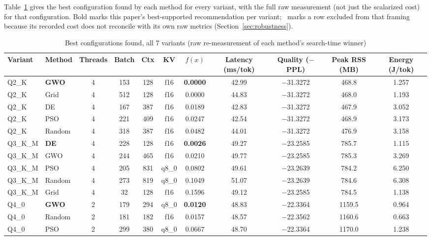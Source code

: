 \documentclass[journal]{IEEEtran}
\begin{document}
Table~\ref{tab:best-configs-all} gives the best configuration found by each method for every variant, with the full raw measurement (not just the scalarized cost) for that configuration. Bold marks this paper's best-supported recommendation per variant; \textdagger\ marks a row excluded from that framing because its recorded cost does not reconcile with its own raw metrics (Section~\ref{sec:robustness}).

\begin{table}[t]
\caption{Best configurations found, all 7 variants (raw re-measurement of each method's search-time winner)}
\label{tab:best-configs-all}
\centering
\scriptsize
\begin{tabular}{@{}llccccccccc@{}}
\toprule
Variant & Method & Threads & Batch & Ctx & KV & $f(x)$ & Latency (ms/tok) & Quality ($-$PPL) & Peak RSS (MB) & Energy (J/tok) \\
\midrule
Q2\_K & \textbf{GWO} & 4 & 153 & 128 & f16 & \textbf{0.0000} & 42.99 & $-$31.3272 & 468.8 & 1.257 \\
Q2\_K & Grid & 4 & 512 & 128 & f16 & 0.0000 & 44.83 & $-$31.3272 & 468.0 & 1.193 \\
Q2\_K & DE & 4 & 167 & 387 & f16 & 0.0189 & 42.83 & $-$31.3272 & 467.9 & 3.052 \\
Q2\_K & PSO & 4 & 221 & 409 & f16 & 0.0247 & 42.54 & $-$31.3272 & 468.9 & 3.173 \\
Q2\_K & Random & 4 & 318 & 387 & f16 & 0.0482 & 44.01 & $-$31.3272 & 476.9 & 3.158 \\
\addlinespace
Q3\_K\_M & \textbf{DE} & 4 & 228 & 128 & f16  & \textbf{0.0026} & 49.27 & $-$23.2585 & 785.7 & 1.115 \\
Q3\_K\_M & GWO & 4 & 244 & 465 & f16  & 0.0210 & 49.77 & $-$23.2585 & 785.3 & 3.269 \\
Q3\_K\_M & PSO & 4 & 205 & 831 & q8\_0 & 0.0802 & 49.61 & $-$23.2639 & 784.2 & 6.250 \\
Q3\_K\_M & Random & 4 & 273 & 819 & q8\_0 & 0.1049 & 51.07 & $-$23.2639 & 784.6 & 6.308 \\
Q3\_K\_M & Grid & 4 & 32 & 128 & f16  & 0.1596 & 49.12 & $-$23.2585 & 784.5 & 1.138 \\
\addlinespace
Q4\_0 & \textbf{GWO} & 2 & 179 & 294 & q8\_0 & \textbf{0.0120} & 48.83 & $-$22.3364 & 1159.5 & 0.964 \\
Q4\_0 & Random & 2 & 181 & 182 & f16 & 0.0157 & 48.57 & $-$22.3562 & 1160.6 & 0.663 \\
Q4\_0 & PSO & 2 & 299 & 380 & q8\_0 & 0.0667 & 48.70 & $-$22.3364 & 1170.0 & 1.238 \\

\end{tabular}
\end{table}
\end{document}
